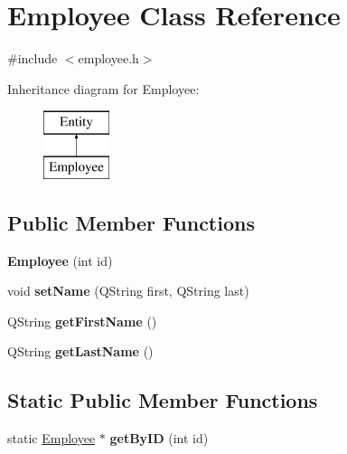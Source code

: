 \hypertarget{class_employee}{\section{Employee Class Reference}
\label{class_employee}
}


{\ttfamily \#include $<$employee.\-h$>$}

Inheritance diagram for Employee\-:\begin{figure}[H]
\begin{center}
\leavevmode
\includegraphics[height=2.000000cm]{class_employee}
\end{center}
\end{figure}
\subsection*{Public Member Functions}
\begin{DoxyCompactItemize}
\item 
\hypertarget{class_employee_a870d18c216c82139c4871ea87c3096a6}{{\bfseries Employee} (int id)}\label{class_employee_a870d18c216c82139c4871ea87c3096a6}

\item 
\hypertarget{class_employee_a67c66a451d22c354f84192450f892f66}{void {\bfseries set\-Name} (Q\-String first, Q\-String last)}\label{class_employee_a67c66a451d22c354f84192450f892f66}

\item 
\hypertarget{class_employee_adb3769cd82ba030068dd96bb6ed4a2e8}{Q\-String {\bfseries get\-First\-Name} ()}\label{class_employee_adb3769cd82ba030068dd96bb6ed4a2e8}

\item 
\hypertarget{class_employee_a129e71f74be20ad0201dedbf62ef31fd}{Q\-String {\bfseries get\-Last\-Name} ()}\label{class_employee_a129e71f74be20ad0201dedbf62ef31fd}

\end{DoxyCompactItemize}
\subsection*{Static Public Member Functions}
\begin{DoxyCompactItemize}
\item 
\hypertarget{class_employee_ae2ba8ebe41c20cfdf75a23b43dea7dfa}{static \hyperlink{class_employee}{Employee} $\ast$ {\bfseries get\-By\-I\-D} (int id)}\label{class_employee_ae2ba8ebe41c20cfdf75a23b43dea7dfa}

\end{DoxyCompactItemize}


